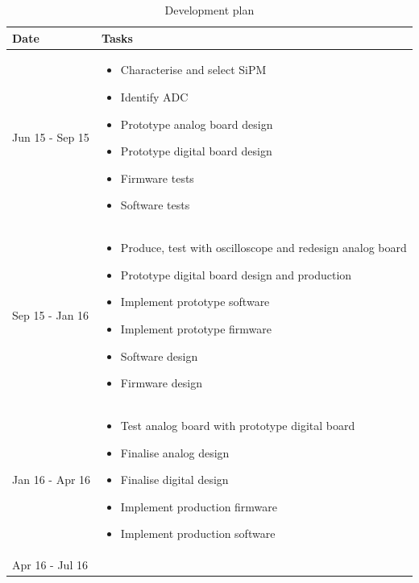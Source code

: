 \documentclass[a4paper]{article}
\begin{document}
\begin{table}[htp]
    \begin{center}
        \caption{Development plan}
        \label{plan}
        \begin{tabular}{p{}p{}}
            \hline
            \hline
            Date & Tasks \\
            \hline
            Jun 15 - Sep 15 & 
            \begin{itemize}
                \item Characterise and select SiPM
                \item Identify ADC
                \item Prototype analog board design
                \item Prototype digital board design
                \item Firmware tests
                \item Software tests
            \end{itemize}
            \\
            Sep 15 - Jan 16 & 
            \begin{itemize}
                \item Produce, test with oscilloscope and redesign analog board 
                \item Prototype digital board design and production
                \item Implement prototype software
                \item Implement prototype firmware
                \item Software design
                \item Firmware design
            \end{itemize}
            \\
            Jan 16 - Apr 16 & 
            \begin{itemize}
                \item Test analog board with prototype digital board
                \item Finalise analog design
                \item Finalise digital design
                \item Implement production firmware
                \item Implement production software
            \end{itemize}
            \\
            Apr 16 - Jul 16 & 

\end{tabular}
\end{center}
\end{table}
\end{document}
